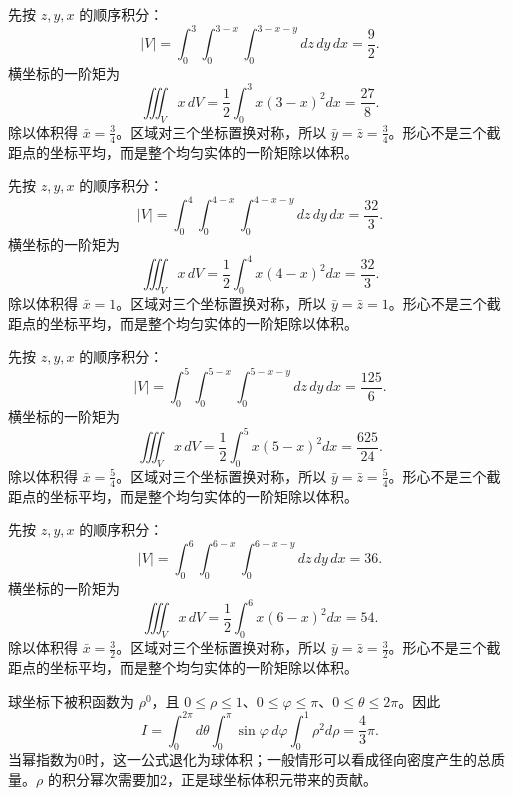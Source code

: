 \documentclass[12pt,fontset=fandol]{ctexart}
\begin{document}
\begin{solve}\label{ans:c38q9}
先按 $z,y,x$ 的顺序积分：
\[
|V|=\int_0^{3}\int_0^{3-x}\int_0^{3-x-y}dz\,dy\,dx=\frac{9}{2}.
\]
横坐标的一阶矩为
\[
\iiint_Vx\,dV=\frac12\int_0^{3}x(3-x)^2dx=\frac{27}{8}.
\]
除以体积得 $\bar x=\frac{3}{4}$。区域对三个坐标置换对称，所以 $\bar y=\bar z=\frac{3}{4}$。形心不是三个截距点的坐标平均，而是整个均匀实体的一阶矩除以体积。
\end{solve}

\begin{solve}\label{ans:c38q10}
先按 $z,y,x$ 的顺序积分：
\[
|V|=\int_0^{4}\int_0^{4-x}\int_0^{4-x-y}dz\,dy\,dx=\frac{32}{3}.
\]
横坐标的一阶矩为
\[
\iiint_Vx\,dV=\frac12\int_0^{4}x(4-x)^2dx=\frac{32}{3}.
\]
除以体积得 $\bar x=1$。区域对三个坐标置换对称，所以 $\bar y=\bar z=1$。形心不是三个截距点的坐标平均，而是整个均匀实体的一阶矩除以体积。
\end{solve}

\begin{solve}\label{ans:c38q11}
先按 $z,y,x$ 的顺序积分：
\[
|V|=\int_0^{5}\int_0^{5-x}\int_0^{5-x-y}dz\,dy\,dx=\frac{125}{6}.
\]
横坐标的一阶矩为
\[
\iiint_Vx\,dV=\frac12\int_0^{5}x(5-x)^2dx=\frac{625}{24}.
\]
除以体积得 $\bar x=\frac{5}{4}$。区域对三个坐标置换对称，所以 $\bar y=\bar z=\frac{5}{4}$。形心不是三个截距点的坐标平均，而是整个均匀实体的一阶矩除以体积。
\end{solve}

\begin{solve}\label{ans:c38q12}
先按 $z,y,x$ 的顺序积分：
\[
|V|=\int_0^{6}\int_0^{6-x}\int_0^{6-x-y}dz\,dy\,dx=36.
\]
横坐标的一阶矩为
\[
\iiint_Vx\,dV=\frac12\int_0^{6}x(6-x)^2dx=54.
\]
除以体积得 $\bar x=\frac{3}{2}$。区域对三个坐标置换对称，所以 $\bar y=\bar z=\frac{3}{2}$。形心不是三个截距点的坐标平均，而是整个均匀实体的一阶矩除以体积。
\end{solve}

\begin{solve}\label{ans:c38q13}
球坐标下被积函数为 $\rho^{0}$，且 $0\le\rho\le 1$、$0\le\varphi\le\pi$、$0\le\theta\le2\pi$。因此
\[
I=\int_0^{2\pi}d\theta\int_0^\pi\sin\varphi\,d\varphi\int_0^{1}\rho^{2}d\rho=\frac{4}{3}\pi.
\]
当幂指数为0时，这一公式退化为球体积；一般情形可以看成径向密度产生的总质量。$\rho$ 的积分幂次需要加2，正是球坐标体积元带来的贡献。
\end{solve}
\end{document}
